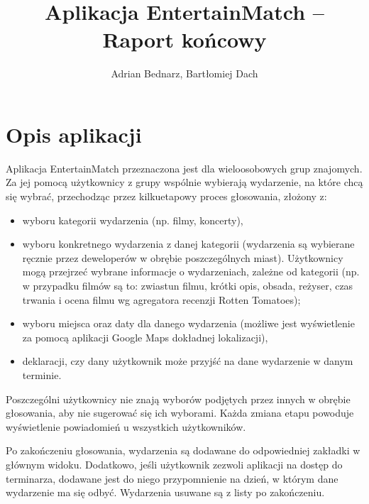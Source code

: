 \documentclass[10pt,a4paper]{article}
\title{Aplikacja EntertainMatch -- Raport końcowy}
\author{Adrian Bednarz, Bartłomiej Dach}
\begin{document}
\maketitle

\section{Opis aplikacji}

Aplikacja EntertainMatch przeznaczona jest dla wieloosobowych grup znajomych.
Za jej pomocą użytkownicy z grupy wspólnie wybierają wydarzenie, na które chcą się wybrać,
przechodząc przez kilkuetapowy proces głosowania, złożony z:

\begin{itemize}
	\item wyboru kategorii wydarzenia (np. filmy, koncerty),
	\item wyboru konkretnego wydarzenia z danej kategorii (wydarzenia są wybierane ręcznie przez
		deweloperów w obrębie poszczególnych miast). Użytkownicy mogą przejrzeć wybrane
		informacje o wydarzeniach, zależne od kategorii (np. w przypadku filmów są to:
		zwiastun filmu, krótki opis, obsada, reżyser, czas trwania i ocena filmu wg agregatora
		recenzji Rotten Tomatoes);
	\item wyboru miejsca oraz daty dla danego wydarzenia (możliwe jest wyświetlenie za pomocą
		aplikacji Google Maps dokładnej lokalizacji),
	\item deklaracji, czy dany użytkownik może przyjść na dane wydarzenie w danym terminie.
\end{itemize}

Poszczególni użytkownicy nie znają wyborów podjętych przez innych w obrębie głosowania, aby nie
sugerować się ich wyborami.
Każda zmiana etapu powoduje wyświetlenie powiadomień u wszystkich użytkowników.

Po zakończeniu głosowania, wydarzenia są dodawane do odpowiedniej zakładki w głównym widoku.
Dodatkowo, jeśli użytkownik zezwoli aplikacji na dostęp do terminarza, dodawane jest do niego
przypomnienie na dzień, w którym dane wydarzenie ma się odbyć.
Wydarzenia usuwane są z listy po zakończeniu.
\end{document}
